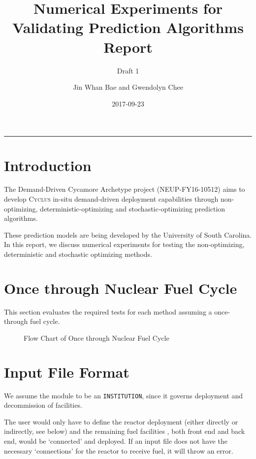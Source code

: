 \documentclass[12pt,letterpaper]{article}
\title{Numerical Experiments for Validating Prediction Algorithms Report}
\subtitle{Draft 1}
\author{Jin Whan Bae and Gwendolyn Chee}
\date{2017-09-23}
\newcommand{\Cyclus}{\textsc{Cyclus}\xspace}%
\begin{document}
	
	\maketitle
	\hrule
	\onehalfspacing
	\thispagestyle{empty}

\section*{Introduction}
The Demand-Driven Cycamore Archetype project (NEUP-FY16-10512) aims to develop \Cyclus in-situ demand-driven deployment capabilities through non-optimizing, deterministic-optimizing and stochastic-optimizing prediction algorithms.

These prediction models are being developed by the University of South Carolina. In this report, we discuss numerical experiments for testing the non-optimizing, deterministic and stochastic optimizing methods. 

\section{Once through Nuclear Fuel Cycle}
This section evaluates the required tests for
each method assuming a once-through fuel cycle.

\begin{figure}[H]
\caption{Flow Chart of Once through Nuclear Fuel Cycle}
\end{figure}

\section{Input File Format}
We assume the module to be an \texttt{INSTITUTION}, since
it governs deployment and decommission of facilities.

The user would only have to define the reactor deployment (either
directly or indirectly, see below) and the remaining fuel facilities
, both front end and back end, would be `connected' and deployed.
If an input file does not have the necessary `connections' for the 
reactor to receive fuel, it will throw an error. 
\end{document}
